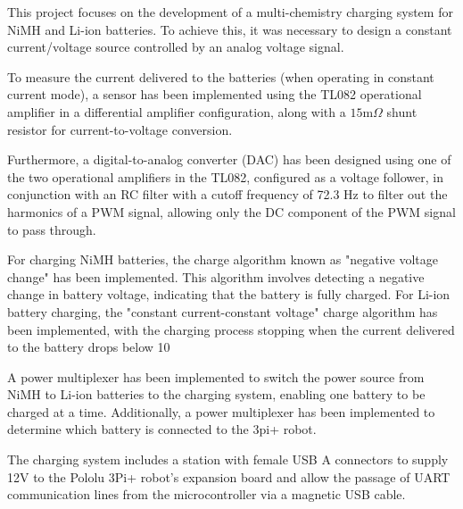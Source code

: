This project focuses on the development of a multi-chemistry charging system for
NiMH and Li-ion batteries. To achieve this, it was necessary to design a 
constant current/voltage source controlled by an analog voltage signal.

To measure the current delivered to the batteries (when operating in constant
current mode), a sensor has been implemented using the TL082 operational 
amplifier in a differential amplifier configuration, along with a $15 \text{m}\Omega$ shunt resistor for current-to-voltage conversion.

Furthermore, a digital-to-analog converter (DAC) has been designed using one of the two operational amplifiers in the TL082, configured as a voltage follower, in conjunction with an RC filter with a cutoff frequency of 72.3 Hz to filter out the harmonics of a PWM signal, allowing only the DC component of the PWM signal to pass through.

For charging NiMH batteries, the charge algorithm known as "negative voltage change"  has been implemented. This algorithm involves detecting a negative change in battery voltage, indicating that the battery is fully charged. For Li-ion battery charging, the "constant current-constant voltage" charge algorithm has been implemented, with the charging process stopping when the current delivered to the battery drops below 10%

A power multiplexer has been implemented to switch the power source from NiMH to Li-ion batteries to the charging system, enabling one battery to be charged at a time. Additionally, a power multiplexer has been implemented to determine which battery is connected to the 3pi+ robot.

The charging system includes a station with female USB A connectors to supply 12V to the Pololu 3Pi+ robot's expansion board and allow the passage of UART communication lines from the microcontroller via a magnetic USB cable.